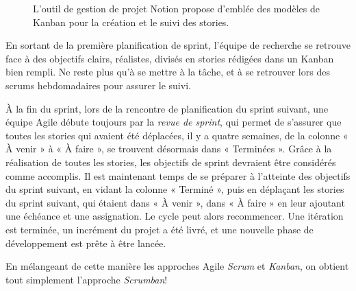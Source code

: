 \documentclass[
  letterpaper,
  DIV=11,
  numbers=noendperiod]{scrreprt}
\begin{document}
\begin{figure}


\caption{\label{fig-kanban}L'outil de gestion de projet Notion propose
d'emblée des modèles de Kanban pour la création et le suivi des
stories.}

\end{figure}%

En sortant de la première planification de sprint, l'équipe de recherche
se retrouve face à des objectifs clairs, réalistes, divisés en stories
rédigées dans un Kanban bien rempli. Ne reste plus qu'à se mettre à la
tâche, et à se retrouver lors des scrums hebdomadaires pour assurer le
suivi.

À la fin du sprint, lors de la rencontre de planification du sprint
suivant, une équipe Agile débute toujours par la \emph{revue de sprint},
qui permet de s'assurer que toutes les stories qui avaient été
déplacées, il y a quatre semaines, de la colonne « À venir » à « À faire
», se trouvent désormais dans « Terminées ». Grâce à la réalisation de
toutes les stories, les objectifs de sprint devraient être considérés
comme accomplis. Il est maintenant temps de se préparer à l'atteinte des
objectifs du sprint suivant, en vidant la colonne « Terminé », puis en
déplaçant les stories du sprint suivant, qui étaient dans « À venir »,
dans « À faire » en leur ajoutant une échéance et une assignation. Le
cycle peut alors recommencer. Une itération est terminée, un incrément
du projet a été livré, et une nouvelle phase de développement est prête
à être lancée.

En mélangeant de cette manière les approches Agile \emph{Scrum} et
\emph{Kanban}, on obtient tout simplement l'approche \emph{Scrumban}!
\end{document}
